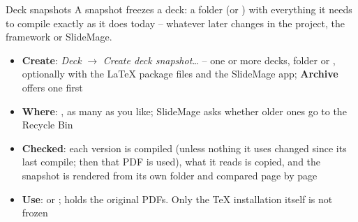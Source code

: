 
\begin{standardframe}{Deck snapshots}
	\small
	A snapshot freezes a deck: a folder (or ) with everything it needs to compile exactly as it does today -- whatever later changes in the project, the framework or SlideMage.
	\par\medskip
	\begin{itemize}
		\item \textbf{Create}: \emph{Deck} $\rightarrow$ \emph{Create deck snapshot\ldots} -- one or more decks, folder or , optionally with the LaTeX package files and the SlideMage app; \textbf{Archive} offers one first
		\item \textbf{Where}: , as many as you like; SlideMage asks whether older ones go to the Recycle Bin
		\item \textbf{Checked}: each version is compiled (unless nothing it uses changed since its last compile; then that PDF is used), what it reads is copied, and the snapshot is rendered from its own folder and compared page by page
		\item \textbf{Use}:  or ;  holds the original PDFs. Only the TeX installation itself is not frozen
	\end{itemize}
\end{standardframe}
